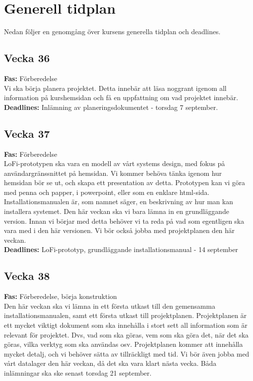 \documentclass{TDP003mall}
\begin{document}
\section{Generell tidplan}
Nedan följer en genomgång över kursens generella tidplan och deadlines.

\subsection*{Vecka 36}

\textbf{Fas:} Förberedelse\\

Vi ska börja planera projektet. Detta innebär att läsa noggrant igenom all information på kurshemsidan och få en uppfattning om vad projektet innebär.\\

\textbf{Deadlines:} Inlämning av planeringsdokumentet - torsdag 7 september.

\subsection*{Vecka 37}

\textbf{Fas:} Förberedelse\\

LoFi-prototypen ska vara en modell av vårt systems design, med fokus på användargränssnittet på hemsidan. Vi kommer behöva tänka igenom hur hemsidan bör se ut, och skapa ett presentation av detta. Prototypen kan vi göra med penna och papper, i powerpoint, eller som en enklare html-sida.
Installationsmanualen är, som namnet säger, en beskrivning av hur man kan installera systemet. Den här veckan ska vi bara lämna in en grundläggande version. Innan vi börjar med detta behöver vi ta reda på vad som egentligen ska vara med i den här versionen.
Vi bör också jobba med projektplanen den här veckan.\\


\textbf{Deadlines:} LoFi-prototyp, grundläggande installationsmanual - 14 september

\subsection*{Vecka 38}

\textbf{Fas:} Förberedelse, börja konstruktion\\

Den här veckan ska vi lämna in ett första utkast till den gemensamma installationsmanualen, samt ett första utkast till projektplanen.
Projektplanen är ett mycket viktigt dokument som ska innehålla i stort sett all information som är relevant för projektet. Dvs, vad som ska göras, vem som ska göra det, när det ska göras, vilka verktyg som ska användas osv. Projektplanen kommer att innehålla mycket detalj, och vi behöver sätta av tillräckligt med tid. 
Vi bör även jobba med vårt datalager den här veckan, då det ska vara klart nästa vecka.
Båda inlämningar ska ske senast torsdag 21 september.\\
\end{document}
